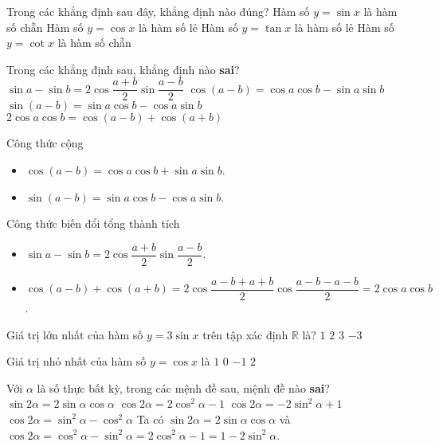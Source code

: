 \begin{ex}%
Trong các khẳng định sau đây, khẳng định nào đúng?
\choice
{Hàm số $y=\sin x$ là hàm số chẵn}
{Hàm số $y=\cos x$ là hàm số lẻ}
{\True Hàm số $y=\tan x$ là hàm số lẻ}
{Hàm số $y=\cot x$ là hàm số chẵn}
\end{ex}

\begin{ex}%
Trong các khẳng định sau, khẳng định nào \textbf{sai}?
\choice
{$\sin a-\sin b=2\cos \dfrac{a+b}{2}\sin \dfrac{a-b}{2}$}
{\True $\cos(a-b)=\cos a\cos b-\sin a\sin b$}
{$\sin(a-b)=\sin a\cos b-\cos a\sin b$}
{$2\cos a\cos b=\cos(a-b)+\cos(a+b)$}
\loigiai
{
Công thức cộng
\begin{itemize}
\item $\cos(a-b)=\cos a\cos b+\sin a\sin b$.
\item $\sin(a-b)=\sin a\cos b-\cos a\sin b$.
\end{itemize}
Công thức biến đổi tổng thành tích
\begin{itemize}
\item $\sin a-\sin b=2\cos \dfrac{a+b}{2}\sin \dfrac{a-b}{2}$.
\item $\cos(a-b)+\cos(a+b) = 2\cos\dfrac{a-b+a+b}{2}\cos\dfrac{a-b-a-b}{2} = 2\cos a\cos b$.
\end{itemize}
}
\end{ex}

\begin{ex}%
Giá trị lớn nhất của hàm số $y=3 \sin x$ trên tập xác định $\mathbb{R}$ là?
\choice
{$1$}
{$2$}
{\True $3$}
{$-3$}
\end{ex}

\begin{ex}%
Giá trị nhỏ nhất của hàm số $y=\cos x$ là
\choice
{\True $1$}
{$0$}
{$-1$}
{$2$}
\end{ex}

\begin{ex}%
Với $\alpha$ là số thực bất kỳ, trong các mệnh đề sau, mệnh đề nào \textbf{sai}?
\choice
{$\sin 2\alpha=2\sin \alpha \cos \alpha$}
{$\cos 2\alpha=2\cos^2 \alpha-1$}
{$\cos 2\alpha=-2\sin^2 \alpha+1$}
{\True $\cos 2\alpha=\sin^2 \alpha-\cos^2 \alpha$}
\loigiai
{
Ta có $\sin 2\alpha = 2\sin\alpha\cos\alpha$ và $\cos 2\alpha = \cos^2 \alpha-\sin^2 \alpha = 2\cos^2 \alpha-1 = 1-2\sin^2 \alpha$.
}
\end{ex}

